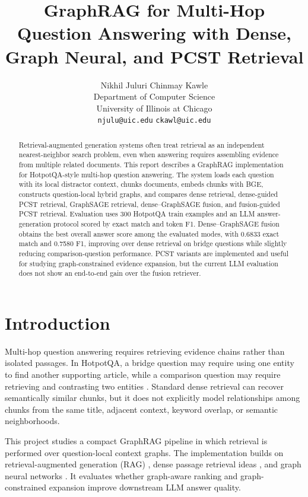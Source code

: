 \documentclass{article}
\title{GraphRAG for Multi-Hop Question Answering with Dense, Graph Neural, and PCST Retrieval}
\author{%
  Nikhil Juluri \quad Chinmay Kawle \\
  Department of Computer Science \\
  University of Illinois at Chicago \\
  \texttt{njulu@uic.edu} \quad
  \texttt{ckawl@uic.edu} \\
}
\begin{document}
\maketitle

\begin{abstract}
Retrieval-augmented generation systems often treat retrieval as an independent nearest-neighbor search problem, even when answering requires assembling evidence from multiple related documents. This report describes a GraphRAG implementation for HotpotQA-style multi-hop question answering. The system loads each question with its local distractor context, chunks documents, embeds chunks with BGE, constructs question-local hybrid graphs, and compares dense retrieval, dense-guided PCST retrieval, GraphSAGE retrieval, dense--GraphSAGE fusion, and fusion-guided PCST retrieval. Evaluation uses 300 HotpotQA train examples and an LLM answer-generation protocol scored by exact match and token F1. Dense--GraphSAGE fusion obtains the best overall answer score among the evaluated modes, with 0.6833 exact match and 0.7580 F1, improving over dense retrieval on bridge questions while slightly reducing comparison-question performance. PCST variants are implemented and useful for studying graph-constrained evidence expansion, but the current LLM evaluation does not show an end-to-end gain over the fusion retriever.
\end{abstract}

\section{Introduction}

Multi-hop question answering requires retrieving evidence chains rather than isolated passages. In HotpotQA, a bridge question may require using one entity to find another supporting article, while a comparison question may require retrieving and contrasting two entities \citep{yang2018hotpotqa}. Standard dense retrieval can recover semantically similar chunks, but it does not explicitly model relationships among chunks from the same title, adjacent context, keyword overlap, or semantic neighborhoods.

This project studies a compact GraphRAG pipeline in which retrieval is performed over question-local context graphs. The implementation builds on retrieval-augmented generation (RAG) \citep{lewis2020rag}, dense passage retrieval ideas \citep{karpukhin2020dpr}, and graph neural networks \citep{hamilton2017graphsage}. It evaluates whether graph-aware ranking and graph-constrained expansion improve downstream LLM answer quality.
\end{document}
